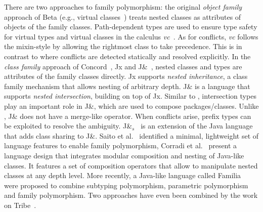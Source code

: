 There are two approaches to family polymorphism: the original \textit{object family}
approach of Beta (e.g., virtual classes~\cite{Madsen_1989}) treats nested classes
as attributes of objects of the family classes. Path-dependent types are used to
ensure type safety for virtual types and virtual classes in the calculus
\textit{vc}~\cite{ErnstVirtual}. As for conflicts, \textit{vc} follows the
mixin-style by allowing the rightmost class to take precedence. This is in
contrast to \name where conflicts are detected statically and resolved
explicitly. In the \textit{class family} approach of Concord~\cite{jolly2004simple},
Jx and J\&~\cite{Nystrom_2004,Nystrom:2006:JNI:1167473.1167476},
nested classes and types are attributes of the family classes directly.
Jx supports \textit{nested inheritance}, a class family mechanism that allows
nesting of arbitrary depth. J\& is a language that supports \textit{nested
  intersection}, building on top of Jx. Similar to \name, intersection types
play an important role in J\&, which are used to compose packages/classes.
Unlike \name, J\& does not have a merge-like operator. When conflicts arise,
prefix types can be exploited to resolve the ambiguity.
J\&$_s$~\cite{Qi:2009:SCF:1542476.1542508} is an extension of the Java language
that adds class sharing to J\&. Saito et al.~\cite{SAITO_2007} identified a
minimal, lightweight set of language features to enable family polymorphism,
Corradi et al.~\cite{Corradi_2012} present a language design that
integrates modular composition and nesting of Java-like classes. It features a
set of composition operators that allow to manipulate nested classes at any
depth level. More recently, a Java-like language called
Familia~\cite{Zhang_2017} were proposed to combine subtyping polymorphism,
parametric polymorphism and family polymorphism. Two approaches have even been
combined by the work on Tribe~\cite{pubsdoc:tribe-virtual-calculus}.








